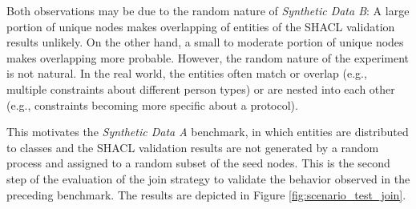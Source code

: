 Both observations may be due to the random nature of \textit{Synthetic Data B}: A large portion of unique nodes makes overlapping of entities of the SHACL validation results unlikely. On the other hand, a small to moderate portion of unique nodes makes overlapping more probable. However, the random nature of the experiment is not natural. In the real world, the entities often match or overlap (e.g., multiple constraints about different person types) or are nested into each other (e.g., constraints becoming more specific about a protocol).

This motivates the \textit{Synthetic Data A} benchmark, in which entities are distributed to classes and the SHACL validation results are not generated by a random process and assigned to a random subset of the seed nodes. This is the second step of the evaluation of the join strategy to validate the behavior observed in the preceding benchmark. The results are depicted in Figure \ref{fig:scenario_test_join}.

